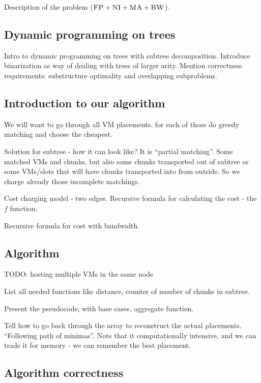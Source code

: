 Description of the problem ($\textsc{FP}+\textsc{NI}+\textsc{MA}+\textsc{BW}$).

\subsection{Dynamic programming on trees}

Intro to dynamic programming on trees with subtree decomposition.
Introduce binarization as way of dealing with trees of larger arity.
Mention correctness requirements: substructure optimality and overlapping subproblems.

\subsection{Introduction to our algorithm}

We will want to go through all VM placements, for each of those do greedy matching and choose the cheapest.

Solution for subtree - how it can look like? It is ``partial matching''. Some matched VMs and chunks, but also some chunks transported out of subtree or some VMs/slots that will have chunks transported into from outside. So we charge already those incomplete matchings.

Cost charging model - two edges. Recursive formula for calculating the cost - the $f$ function. 

Recursive formula for cost with bandwidth. 

\subsection{Algorithm}

TODO: hosting multiple VMs in the same node

List all needed functions like distance, counter of number of chunks in subtree.

Present the pseudocode, with base cases, aggregate function.

Tell how to go back through the array to reconstruct the actual placements. ``Following path of minimas''.
Note that it computationally intensive, and we can trade it for memory - we can remember the best placement.

\subsection{Algorithm correctness}
